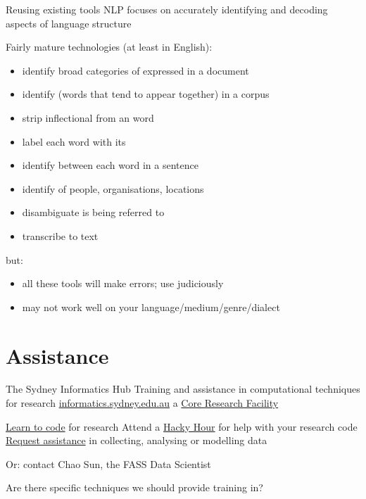 \begin{points}{Reusing existing tools}
\p NLP focuses on accurately identifying and decoding aspects of language structure

\p Fairly mature technologies (at least in English):
\begin{itemize}
	\item identify broad categories of  expressed in a document
	\item identify  (words that tend to appear together) in a corpus
	\item strip inflectional  from an word
	\item label each word with its 
	\item identify  between each word in a sentence
	\item identify  of people, organisations, locations
	\item disambiguate  is being referred to
	\item transcribe  to text
\end{itemize}

\item but:
\begin{itemize}
\item all these tools will make errors; use judiciously
\item may not work well on your language/medium/genre/dialect
	\end{itemize}
\end{points}


\section{Assistance}

\begin{points}{The Sydney Informatics Hub}
	\p Training and assistance in computational techniques for research
	\p \url{informatics.sydney.edu.au}
	\p a \href{https://sydney.edu.au/research/facilities.html}{Core Research Facility}

	\vfill
	\p \href{https://informatics.sydney.edu.au/services/training/}{Learn to code} for research
	\p Attend a \href{https://informatics.sydney.edu.au/hackyhour/}{Hacky Hour} for help with your research code
	\p \href{https://goo.gl/9VkMXN}{Request assistance} in collecting, analysing or modelling data
	\begin{itemize}
	\p Or: contact Chao Sun, the FASS Data Scientist
	\end{itemize}
	\vfill
	\p Are there specific techniques we should provide training in?
\end{points}


